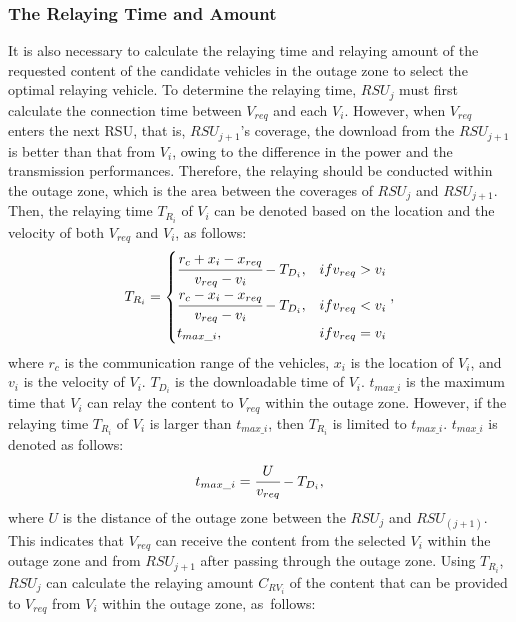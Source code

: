 \documentclass[electronics,aricle,accept,pdftex,moreauthors]{Definitions/mdpi}
\begin{document}
\subsubsection{The Relaying Time and Amount} \label{sec3.2.2}
It is also necessary to calculate the relaying time and relaying amount of the requested content of the candidate vehicles in the outage zone to select the optimal relaying vehicle. To determine the relaying time, $RSU_{j}$ must first calculate the connection time between $V_{req}$ and each $V_{i}$.
However, when $V_{req}$ enters the next RSU, that is, $RSU_{j+1}$'s coverage, the download from the $RSU_{j+1}$ is better than that from $V_{i}$, owing to the difference in the power and the transmission performances.
Therefore, the relaying should be conducted within the outage zone, which is the area between the coverages of $RSU_{j}$ and $RSU_{j+1}$. Then, the relaying time ${T}_{{R}_{i}}$ of $V_{i}$ can be denoted based on the location and the velocity of both $V_{req}$ and $V_{i}$, as follows:
\begin{equation}
{T}_{{R}_{i}}=
    \begin{cases} %
        \cfrac{{r}_{c}+{x}_{i}-{x}_{req}}{{v}_{req}-{v}_{i}} - {T}_{{D}_{i}}, & if {v}_{req} > {v}_{i}\\
        \cfrac{{r}_{c}-{x}_{i}-{x}_{req}}{{v}_{req}-{v}_{i}} - {T}_{{D}_{i}}, & if {v}_{req} < {v}_{i}\\ 
        {t}_{max\_i}, & if {v}_{req} = {v}_{i}
    \end{cases},
\end{equation}
where ${r}_{c}$ is the communication range of the vehicles, ${x}_{i}$ is the location of $V_{i}$, and $v_{i}$ is the velocity of $V_{i}$. ${T}_{{D}_{i}}$ is the downloadable time of ${V}_{i}$.
${t}_{max\_i}$ is the maximum time that $V_{i}$ can relay the content to $V_{req}$ within the outage zone.
However, if the relaying time $T_{R_{i}}$ of $V_{i}$ is larger than ${t}_{max\_i}$, then $T_{R_{i}}$ is limited to ${t}_{max\_i}$.
${t}_{max\_i}$ is denoted as follows:
\begin{equation}
     {t}_{max\_i}=\cfrac{U}{{v}_{req}} - {T}_{{D}_{i}}, %
\end{equation}
where $U$ is the distance of the outage zone between the ${RSU}_{j}$ and ${RSU}_{(j+1)}$.
This indicates that $V_{req}$ can receive the content from the selected $V_{i}$ within the outage zone and from  $RSU_{j+1}$ after passing through the outage zone.
Using $T_{R_{i}}$, $RSU_{j}$ can calculate the relaying amount ${C}_{{RV}_{i}}$ of the  content  that can be provided to $V_{req}$ from $V_{i}$ within the outage zone, as~follows:
\end{document}
